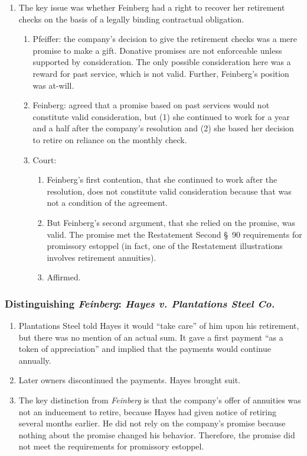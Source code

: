 \begin{enumerate}
    \item The key issue was whether Feinberg had a right to recover her 
    retirement checks on the basis of a legally binding contractual 
    obligation.
    \begin{enumerate}
        \item Pfeiffer: the company's decision to give the retirement checks 
        was a mere promise to make a gift. Donative promises are not 
        enforceable unless supported by consideration. The only possible 
        consideration here was a reward for past service, which is not valid. 
        Further, Feinberg's position was at-will.
        \item Feinberg: agreed that a promise based on past services would not 
        constitute valid consideration, but (1) she continued to work for a 
        year and a half after the company's resolution and (2) she based her 
        decision to retire on reliance on the monthly check.
        \item Court: 
        \begin{enumerate}
            \item Feinberg's first contention, that she continued to work 
            after the resolution, does not constitute valid consideration 
            because that was not a condition of the agreement.
            \item But Feinberg's second argument, that she relied on the 
            promise, was valid. The promise met the Restatement Second \S\ 90 
            requirements for promissory estoppel (in fact, one of the 
            Restatement illustrations involves retirement annuities).
            \item Affirmed.
        \end{enumerate}
    \end{enumerate}
\end{enumerate}

\subsubsection{Distinguishing \emph{Feinberg}: \emph{Hayes v. Plantations 
Steel Co.}}

\begin{enumerate}
    \item Plantations Steel told Hayes it would ``take care'' of him upon his 
    retirement, but there was no mention of an actual sum. It gave a first 
    payment ``as a token of appreciation'' and implied that the payments would 
    continue annually.
    \item Later owners discontinued the payments. Hayes brought suit.
    \item The key distinction from \emph{Feinberg} is that the company's offer 
    of annuities was not an inducement to retire, because Hayes had given 
    notice of retiring several months earlier. He did not rely on the 
    company's promise because nothing about the promise changed his behavior. 
    Therefore, the promise did not meet the requirements for promissory 
    estoppel.
\end{enumerate}
 
